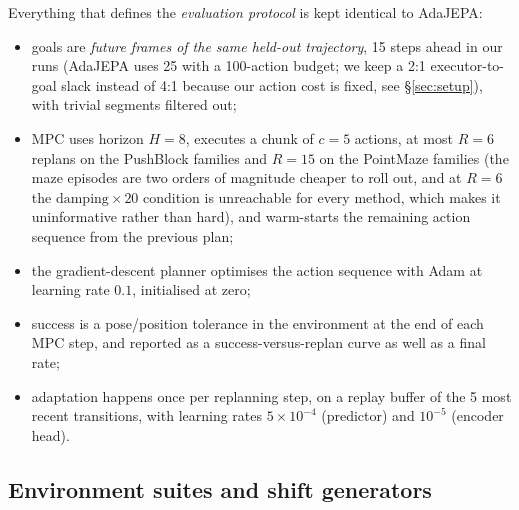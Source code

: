 Everything that defines the \emph{evaluation protocol} is kept identical to AdaJEPA:
\begin{itemize}[leftmargin=1.2em,itemsep=2pt]
\item goals are \emph{future frames of the same held-out trajectory}, 15 steps ahead in our
runs (AdaJEPA uses 25 with a 100-action budget; we keep a 2:1 executor-to-goal slack instead
of 4:1 because our action cost is fixed, see \S\ref{sec:setup}), with trivial segments
filtered out;
\item MPC uses horizon $H=8$, executes a chunk of $c=5$ actions, at most $R=6$ replans on the
PushBlock families and $R=15$ on the PointMaze families (the maze episodes are two orders of
magnitude cheaper to roll out, and at $R=6$ the $\text{damping}\times20$ condition is
unreachable for every method, which makes it uninformative rather than hard),
and warm-starts the remaining action sequence from the previous plan;
\item the gradient-descent planner optimises the action sequence with Adam at learning rate
$0.1$, initialised at zero;
\item success is a pose/position tolerance in the environment at the end of each MPC step, and
reported as a success-versus-replan curve as well as a final rate;
\item adaptation happens once per replanning step, on a replay buffer of the 5 most recent
transitions, with learning rates $5\times10^{-4}$ (predictor) and $10^{-5}$ (encoder head).
\end{itemize}

\subsection{Environment suites and shift generators}

